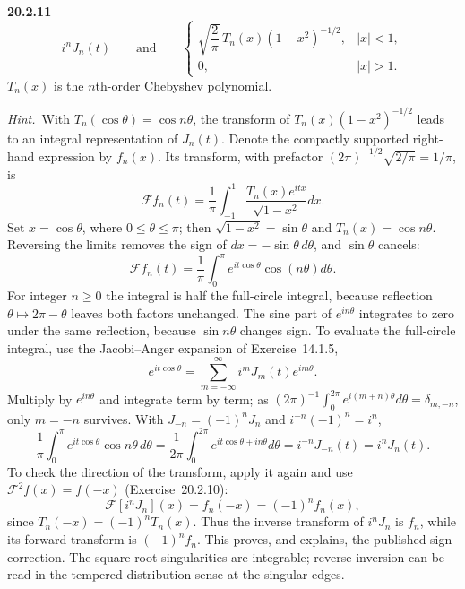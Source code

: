\par\bigskip
\noindent\textbf{20.2.11}\quad {}
\[
i^{n}J_{n}(t)\qquad\text{and}\qquad
\begin{cases}
\sqrt{\dfrac{2}{\pi}}\,T_{n}(x)(1-x^{2})^{-1/2},
& |x| < 1,\\[10pt]
0, & |x| > 1.
\end{cases}
\]
$T_{n}(x)$ is the $n$th-order Chebyshev polynomial.
\par{}
\par\emph{Hint.}~With $T_{n}(\cos\theta)=\cos n\theta$, the
transform of $T_{n}(x)(1-x^{2})^{-1/2}$ leads to an integral
representation of $J_{n}(t)$.
\solution
Denote the compactly supported right-hand expression
by $f_n(x)$. Its transform, with prefactor
$(2\pi)^{-1/2}\sqrt{2/\pi}=1/\pi$, is
\[
\mathcal Ff_n(t)=\frac1\pi\int_{-1}^1
\frac{T_n(x)e^{itx}}{\sqrt{1-x^2}}dx.
\]
Set $x=\cos\theta$, where $0\le\theta\le\pi$; then
$\sqrt{1-x^2}=\sin\theta$ and $T_n(x)=\cos n\theta$. Reversing
the limits removes the sign of $dx=-\sin\theta\,d\theta$, and
$\sin\theta$ cancels:
\[
\mathcal Ff_n(t)=\frac1\pi\int_0^\pi
 e^{it\cos\theta}\cos(n\theta)d\theta.
\]
For integer $n\ge0$ the integral is half the full-circle
integral, because reflection $\theta\mapsto2\pi-\theta$ leaves
both factors unchanged. The sine part of $e^{in\theta}$ integrates
to zero under the same reflection, because $\sin n\theta$ changes
sign. To evaluate the full-circle integral, use the
Jacobi--Anger expansion of Exercise~14.1.5,
\[
e^{it\cos\theta}=\sum_{m=-\infty}^{\infty}i^mJ_m(t)e^{im\theta}.
\]
Multiply by $e^{in\theta}$ and integrate term by term; as
$(2\pi)^{-1}\int_0^{2\pi}e^{i(m+n)\theta}d\theta=\delta_{m,-n}$,
only $m=-n$ survives. With $J_{-n}=(-1)^nJ_n$ and
$i^{-n}(-1)^n=i^n$,
\[
\frac1\pi\int_0^\pi e^{it\cos\theta}\cos n\theta\,d\theta
=\frac1{2\pi}\int_0^{2\pi}e^{it\cos\theta+in\theta}d\theta
=i^{-n}J_{-n}(t)=\boxed{i^nJ_n(t)}.
\]
To check the direction of the transform, apply it again and use
$\mathcal F^2f(x)=f(-x)$ (Exercise~20.2.10):
\[
\mathcal F[i^nJ_n](x)=f_n(-x)=(-1)^nf_n(x),
\]
since $T_n(-x)=(-1)^nT_n(x)$. Thus the inverse transform of
$i^nJ_n$ is $f_n$, while its forward transform is $(-1)^nf_n$.
This proves, and explains, the published sign correction. The
square-root singularities are integrable; reverse inversion can
be read in the tempered-distribution sense at the singular edges.

